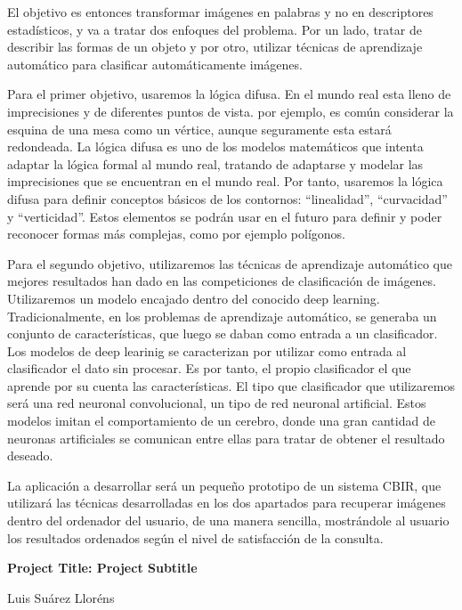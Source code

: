 El objetivo es entonces transformar imágenes en palabras y no en descriptores estadísticos, y va a tratar dos enfoques del problema. Por un lado, tratar de describir las formas de un objeto y por otro, utilizar técnicas de aprendizaje automático para clasificar automáticamente imágenes.

Para el primer objetivo, usaremos la lógica difusa. En el mundo real esta lleno de imprecisiones y de diferentes puntos de vista. por ejemplo, es común considerar la esquina de una mesa como un vértice, aunque seguramente esta estará redondeada. La lógica difusa es uno de los modelos matemáticos que intenta adaptar la lógica formal al mundo real, tratando de adaptarse y modelar las imprecisiones que se encuentran en el mundo real. Por tanto, usaremos la lógica difusa para definir conceptos básicos de los contornos: ``linealidad'', ``curvacidad'' y ``verticidad''. Estos elementos se podrán usar en el futuro para definir y poder reconocer formas más complejas, como por ejemplo polígonos.  

Para el segundo objetivo, utilizaremos las técnicas de aprendizaje automático que mejores resultados han dado en las competiciones de clasificación de imágenes. Utilizaremos un modelo encajado dentro del conocido deep learning. Tradicionalmente, en los problemas de aprendizaje automático, se generaba un conjunto de características, que luego se daban como entrada a un clasificador. Los modelos de deep learinig se caracterizan por utilizar como entrada al clasificador el dato sin procesar. Es por tanto, el propio clasificador el que aprende por su cuenta las características. El tipo que clasificador que utilizaremos será una red neuronal convolucional, un tipo de red neuronal artificial. Estos modelos imitan el comportamiento de un cerebro, donde una gran cantidad de neuronas artificiales se comunican entre ellas para tratar de obtener el resultado  deseado.

La aplicación a desarrollar será un pequeño prototipo de un sistema CBIR, que utilizará las técnicas desarrolladas en los dos apartados para recuperar imágenes dentro del ordenador del usuario, de una manera sencilla, mostrándole al usuario los resultados ordenados según el nivel de satisfacción de la consulta.
 
\cleardoublepage


\thispagestyle{empty}

\begin{center}
{\large\bfseries Project Title: Project Subtitle}\\
\end{center}
\begin{center}
Luis Suárez Lloréns\\
\end{center}

